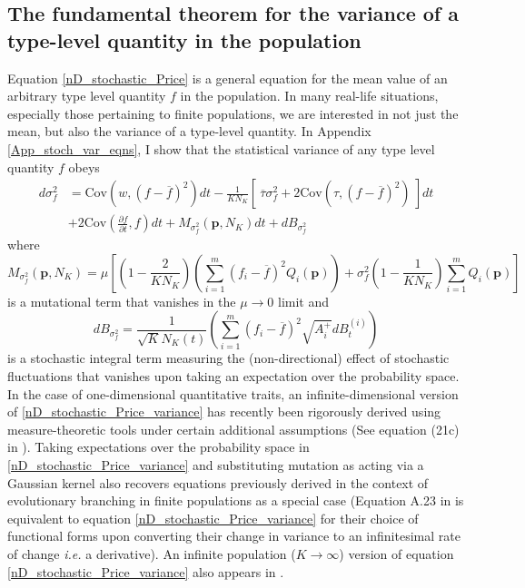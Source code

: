 \subsection{The fundamental theorem for the variance of a type-level quantity in the population}\label{sec_fun_theorems_var}
Equation \eqref{nD_stochastic_Price} is a general equation for the mean value of an arbitrary type level quantity $f$ in the population. In many real-life situations, especially those pertaining to finite populations, we are interested in not just the mean, but also the variance of a type-level quantity. In Appendix \ref{App_stoch_var_eqns}, I show that the statistical variance of any type level quantity $f$ obeys
\begin{equation}
\label{nD_stochastic_Price_variance}
\begin{aligned}
d\sigma^2_{f} &= \textrm{Cov}\left(w,(f - \overline{f})^2\right)dt - \frac{1}{KN_K}\left[ \ \overline{\tau}\sigma^2_{f} +  2\textrm{Cov}\left(\tau,(f - \overline{f})^2\right) \ \right]dt\\[12pt]
& + 2\textrm{Cov}\left(\frac{\partial f}{\partial t},f\right)dt + M_{\sigma^2_f}(\mathbf{p},N_K)dt + dB_{\sigma^2_{f}}
\end{aligned}
\end{equation}
where
\begin{equation}
\label{variance_price_mutation_term}
M_{\sigma^2_f}(\mathbf{p},N_K) = \mu\left[\left(1 - \frac{2}{KN_K}\right)\left(\sum\limits_{i=1}^{m}(f_i - \overline{f})^2Q_i(\mathbf{p})\right) + \sigma^2_f\left(1 - \frac{1}{KN_K}\right)\sum\limits_{i=1}^{m}Q_i(\mathbf{p})\right]
\end{equation}
is a mutational term that vanishes in the $\mu \to 0$ limit and
\begin{equation}
\label{variance_price_diffusion_term}
dB_{\sigma^2_f} = \frac{1}{\sqrt{K}N_{K}(t)}\left(\sum\limits_{i=1}^{m}\left(f_i - \overline{f}\right)^2\sqrt{A_i^+}dB_{t}^{(i)}\right)
\end{equation}
is a stochastic integral term measuring the (non-directional) effect of stochastic fluctuations that vanishes upon taking an expectation over the probability space. In the case of one-dimensional quantitative traits, an infinite-dimensional version of \eqref{nD_stochastic_Price_variance} has recently been rigorously derived \citep{week_white_2021} using measure-theoretic tools under certain additional assumptions (See equation (21c) in \cite{week_white_2021}). Taking expectations over the probability space in \eqref{nD_stochastic_Price_variance} and substituting mutation as acting via a Gaussian kernel also recovers equations previously derived \citep{debarre_evolutionary_2016} in the context of evolutionary branching in finite populations as a special case (Equation A.23 in \cite{debarre_evolutionary_2016} is equivalent to equation \eqref{nD_stochastic_Price_variance} for their choice of functional forms upon converting their change in variance to an infinitesimal rate of change \emph{i.e.} a derivative). An infinite population ($K \to \infty$) version of equation \eqref{nD_stochastic_Price_variance} also appears in \cite{lion_theoretical_2018}.\\
